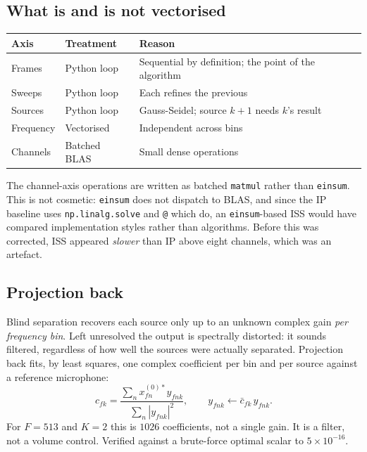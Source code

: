 \documentclass[11pt,a4paper]{article}
\begin{document}
\subsection{What is and is not vectorised}

\begin{table}[h]
\centering
\begin{tabular}{lll}
\toprule
Axis & Treatment & Reason \\
\midrule
Frames & Python loop & Sequential by definition; the point of the algorithm \\
Sweeps & Python loop & Each refines the previous \\
Sources & Python loop & Gauss-Seidel; source $k+1$ needs $k$'s result \\
Frequency & Vectorised & Independent across bins \\
Channels & Batched BLAS & Small dense operations \\
\bottomrule
\end{tabular}
\end{table}

The channel-axis operations are written as batched \verb|matmul| rather than
\verb|einsum|. This is not cosmetic: \verb|einsum| does not dispatch to BLAS,
and since the IP baseline uses \verb|np.linalg.solve| and \verb|@| which do, an
\verb|einsum|-based ISS would have compared implementation styles rather than
algorithms. Before this was corrected, ISS appeared \emph{slower} than IP above
eight channels, which was an artefact.

\subsection{Projection back}

Blind separation recovers each source only up to an unknown complex gain
\emph{per frequency bin}. Left unresolved the output is spectrally distorted:
it sounds filtered, regardless of how well the sources were actually separated.
Projection back fits, by least squares, one complex coefficient per bin and per
source against a reference microphone:
%
\begin{equation}
c_{fk} = \frac{\sum_n x_{f n}^{(0)*} y_{fnk}}{\sum_n |y_{fnk}|^2},
\qquad
y_{fnk} \leftarrow \bar{c}_{fk}\, y_{fnk}.
\end{equation}
%
For $F = 513$ and $K = 2$ this is $1026$ coefficients, not a single gain. It is
a filter, not a volume control. Verified against a brute-force optimal scalar to
$5\times10^{-16}$.
\end{document}
